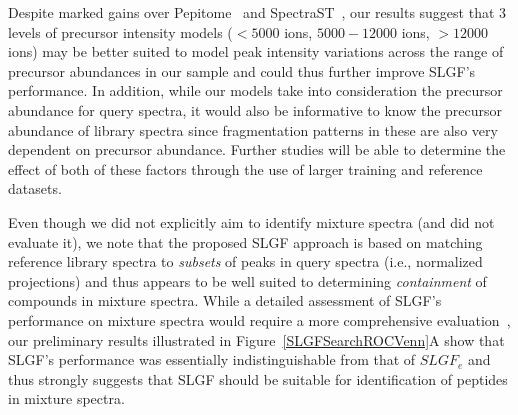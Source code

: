 \documentclass[endnotes,11pt]{article}
\begin{document}
%


Despite marked gains over Pepitome~\cite{dasari12} and SpectraST~\cite{lam07}, our results suggest that 3 levels of precursor intensity models ($<5000$ ions, $5000-12000$ ions, $>12000$ ions) may be better suited to model peak intensity variations across the range of precursor abundances in our sample and could thus further improve SLGF's performance. In addition, while our models take into consideration the precursor abundance for query spectra, it would also be informative to know the precursor abundance of library spectra since fragmentation patterns in these are also very dependent on precursor abundance. Further studies will be able to determine the effect of both of these factors through the use of larger training and reference datasets.

Even though we did not explicitly aim to identify mixture spectra (and did not evaluate it), we note that the proposed SLGF approach is based on matching reference library spectra to {\em subsets} of peaks in query spectra (i.e., normalized projections) and thus appears to be well suited to determining \emph{containment} of compounds in mixture spectra. While a detailed assessment of SLGF's performance on mixture spectra would require a more comprehensive evaluation~\cite{wang10}, our preliminary results illustrated in Figure~\ref{SLGFSearchROCVenn}A show that SLGF's performance was essentially indistinguishable from that of $SLGF_e$ and thus strongly suggests that SLGF should be suitable for identification of peptides in mixture spectra.

\end{document}
